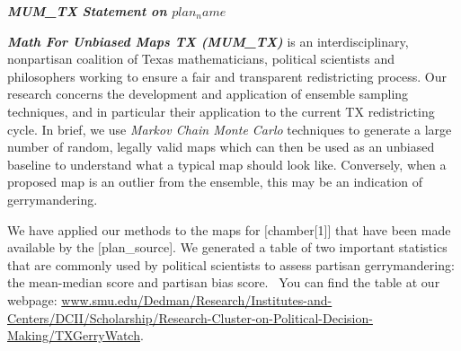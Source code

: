 \documentclass[letterpaper]{article}
\title{}
\author{Barreiro, Andrea}
\newcommand\textstyleInternetlink[1]{\textcolor[rgb]{0.019607844,0.3882353,0.75686276}{#1}}
\newcommand{\VAR}[1] {$#1$}
\begin{document}
\textbf{\textit{MUM\_TX Statement on \VAR{plan_name}}}

\bigskip

\textbf{\textit{Math For Unbiased Maps TX (MUM\_TX) }}is\textbf{\textit{ }}an interdisciplinary, nonpartisan coalition
of Texas mathematicians, political scientists and philosophers working to ensure a fair and transparent redistricting
process. Our research concerns the development and application of ensemble sampling techniques, and in particular their
application to the current TX redistricting cycle. In brief, we use \textit{Markov Chain Monte Carlo }techniques to
generate a large number of random, legally valid maps which can then be used as an unbiased baseline to understand what
a typical map should look like. Conversely, when a proposed map is an outlier from the ensemble, this may be an
indication of gerrymandering.

\bigskip

We have applied our methods to the maps for \VAR[chamber[1]] that have been made available by the \VAR[plan_source]. 
We generated a table of two important statistics that are commonly used by political scientists to assess
partisan gerrymandering: the mean-median score and partisan bias score. \ You can find the table at our webpage:
\href{http://www.smu.edu/Dedman/Research/Institutes-and-Centers/DCII/Scholarship/Research-Cluster-on-Political-Decision-Making/TXGerryWatch}{\textstyleInternetlink{www.smu.edu/Dedman/Research/Institutes-and-Centers/DCII/Scholarship/Research-Cluster-on-Political-Decision-Making/TXGerryWatch}}.

\end{document}
